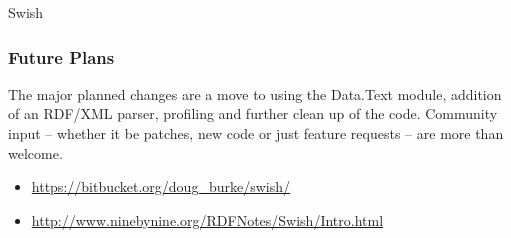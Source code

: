\documentclass{scrreprt}
\begin{document}
\begin{hcarentry}{Swish}
\subsubsection*{Future Plans}

The major planned changes are a move to using the
Data.Text module,
addition of an RDF/XML parser, profiling 
and further clean up of the code.
Community input -- whether it be patches, new code or just feature
requests -- are more than welcome.

\FurtherReading

\begin{itemize}
\item \url{https://bitbucket.org/doug_burke/swish/}
\item \url{http://www.ninebynine.org/RDFNotes/Swish/Intro.html}
\end{itemize}

\end{hcarentry}
\end{document}
